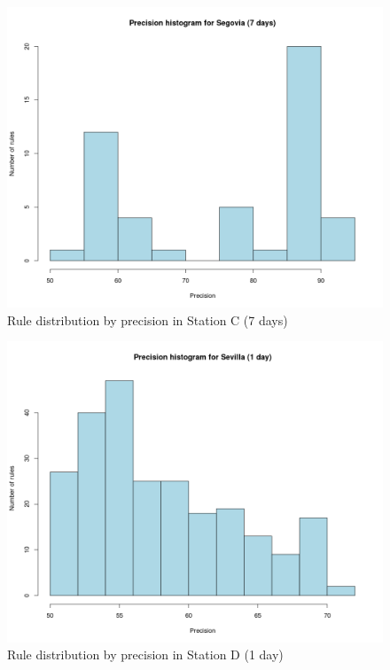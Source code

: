 \begin{figure}[hbtp]
\includegraphics[width=\textwidth]{img/hist_seg7.png}
\caption{Rule distribution by precision in Station C (7 days)} \label{fig:hist_seg7}
\end{figure}

\begin{figure}[hbtp]
\includegraphics[width=\textwidth]{img/hist_sev1.png}
\caption{Rule distribution by precision in Station D (1 day)} \label{fig:hist_sev1}
\end{figure}

